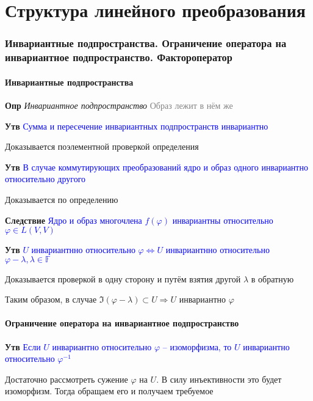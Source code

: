 \documentclass[a4paper, 14pt]{article}
\begin{document}
     \part*{Структура линейного преобразования}

    \section{Инвариантные подпространства.
    Ограничение оператора на инвариантное подпространство.
    Фактороператор}

    \subsection{Инвариантные подпространства}

    \textbf{Опр} \textit{Инвариантное подпространство} \textcolor{gray}{Образ лежит в нём же}

    \textbf{Утв} \textcolor{blue}{Сумма и пересечение инвариантных подпространств инвариантно}

    Доказывается поэлементной проверкой определения

    \textbf{Утв} \textcolor{blue}{В случае коммутирующих преобразований ядро и образ одного инвариантно относительно
    другого}

    Доказывается по определению

    \textbf{Следствие} \textcolor{blue}{Ядро и образ многочлена $f(\varphi)$ инвариантны относительно $\varphi \in L(
    V, V)$}

    \textbf{Утв} \textcolor{blue}{$U$ инвариантнно относительно $\varphi \Leftrightarrow U$ инвариантнно
    относительно $\varphi - \lambda, \lambda \in \mathbb{F}$}

    Доказывается проверкой в одну сторону и путём взятия другой $\lambda$ в обратную

    Таким образом, в случае $\Im (\varphi - \lambda) \subset U \Rightarrow U$ инвариантно $\varphi$

    \subsection{Ограничение оператора на инвариантное подпространство}

    \textbf{Утв} \textcolor{blue}{Если $U$ инвариантно относительно $\varphi$ -- изоморфизма, то $U$ инвариантно
    относительно $\varphi^{-1}$}

    Достаточно рассмотреть сужение $\varphi$ на $U$.
    В силу инъективности это будет изоморфизм.
    Тогда обращаем его и получаем требуемое
\end{document}
